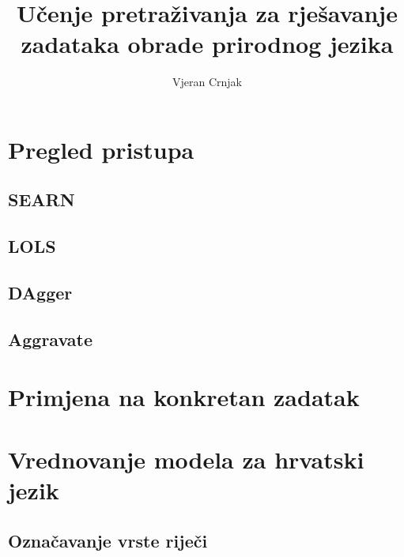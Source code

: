 \documentclass[times, utf8, diplomski]{fer}
\begin{document}

\title{Učenje pretraživanja za rješavanje zadataka obrade prirodnog jezika}

\author{Vjeran Crnjak}

\maketitle

\izvornik

\zahvala{}

\tableofcontents
\listoffigures
\listoftables



\chapter{Pregled pristupa}

\section{SEARN}
\section{LOLS}
\section{DAgger}
\section{Aggravate}

\chapter{Primjena na konkretan zadatak}

\chapter{Vrednovanje modela za hrvatski jezik}

\section{Označavanje vrste riječi}
\end{document}
